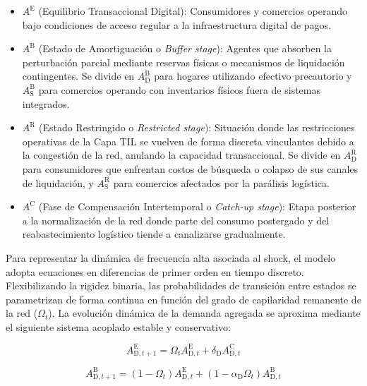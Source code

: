 \begin{itemize}
    \item $A^{\text{E}}$ (Equilibrio Transaccional Digital): Consumidores y comercios operando bajo condiciones de acceso regular a la infraestructura digital de pagos.
    \item $A^{\text{B}}$ (Estado de Amortiguaci\'on o \textit{Buffer stage}): Agentes que absorben la perturbaci\'on parcial mediante reservas f\'isicas o mecanismos de liquidaci\'on contingentes. Se divide en $A_{\text{D}}^{\text{B}}$ para hogares utilizando efectivo precautorio y $A_{\text{S}}^{\text{B}}$ para comercios operando con inventarios f\'isicos fuera de sistemas integrados.
    \item $A^{\text{R}}$ (Estado Restringido o \textit{Restricted stage}): Situaci\'on donde las restricciones operativas de la Capa TIL se vuelven de forma discreta vinculantes debido a la congesti\'on de la red, anulando la capacidad transaccional. Se divide en $A_{\text{D}}^{\text{R}}$ para consumidores que enfrentan costos de b\'usqueda o colapso de sus canales de liquidaci\'on, y $A_{\text{S}}^{\text{R}}$ para comercios afectados por la par\'alisis log\'istica.
    \item $A^{\text{C}}$ (Fase de Compensaci\'on Intertemporal o \textit{Catch-up stage}): Etapa posterior a la normalizaci\'on de la red donde parte del consumo postergado y del reabastecimiento log\'istico tiende a canalizarse gradualmente.
\end{itemize}

Para representar la din\'amica de frecuencia alta asociada al shock, el modelo adopta ecuaciones en diferencias de primer orden en tiempo discreto. Flexibilizando la rigidez binaria, las probabilidades de transici\'on entre estados se parametrizan de forma continua en funci\'on del grado de capilaridad remanente de la red ($\Omega_t$). La evoluci\'on din\'amica de la demanda agregada se aproxima mediante el siguiente sistema acoplado estable y conservativo:

\begin{equation}
    A^{\text{E}}_{\text{D}, t+1} = \Omega_t A^{\text{E}}_{\text{D}, t} + \delta_{\text{D}} A^{\text{C}}_{\text{D}, t}
    \label{eq:markov_demand_1}
\end{equation}

\begin{equation}
    A^{\text{B}}_{\text{D}, t+1} = (1 - \Omega_t) A^{\text{E}}_{\text{D}, t} + (1 - \alpha_{\text{D}} \Omega_t) A^{\text{B}}_{\text{D}, t}
    \label{eq:markov_demand_2}
\end{equation}

